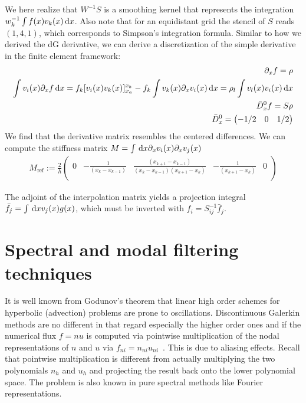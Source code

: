 We here realize that $W^{-1}S$  is a smoothing kernel that represents the
integration $w_k^{-1} \int f(x) v_k(x)\,\mathrm{d}x$.
Also note that for an equidistant grid the stencil of $S$ reads $(1,4,1)$, which
corresponds to Simpson's integration formula.
Similar to how we derived the dG derivative, we can derive a discretization of the
simple derivative in the finite element framework:
\begin{align}
    \partial_x f = \rho \nonumber\\
    \int v_i(x) \partial_x f \,\mathrm{d}x = f_k [v_i(x) v_k(x)]_{x_a}^{x_b} - f_k \int v_k(x)\partial_x v_i(x) \,\mathrm{d}x = \rho_l \int v_l(x) v_i(x)\,\mathrm{d}x \nonumber \\
    \bar D_x^0 f = S\rho \\
    \bar D_x^0 = \begin{pmatrix}
        -1/2 & 0 & 1/2
        \end{pmatrix}
\end{align}
We find that the derivative matrix resembles the centered differences.
We can compute the stiffness matrix $M=\int\,\mathrm{d}x \partial_x v_i(x)\partial_x v_j(x)$
\begin{align}
    M_{\text{ref}} := \frac{2}{h}\begin{pmatrix}
        0 & -\frac{1}{(x_{k} - x_{k-1})} & \frac{(x_{k+1}-x_{k-1})}{(x_{k} - x_{k-1})(x_{k+1} - x_k)} & -\frac{1}{(x_{k+1} - x_k)} & 0 \\
    \end{pmatrix}
\end{align}

The adjoint of the interpolation matrix yields a projection integral $\bar f_j = \int \,\mathrm{d}x v_j(x) g(x)$, which must be inverted with $f_i = S_{ij}^{-1} \bar f_j$.


\section{Spectral and modal filtering techniques}
It is well known from Godunov's theorem that linear high order schemes for hyperbolic (advection) problems
are prone to oscillations. Discontinuous Galerkin methods are no different in that regard
especially the higher order ones and if the numerical flux $f=nu$ is computed via pointwise multiplication
of the nodal representations of $n$ and $u$ via $f_{ni} = n_{ni} u_{ni}$~\cite{NodalDG}.
This is due to aliasing effects. Recall that pointwise multiplication is different from
actually multiplying the two polynomials $n_h$ and $u_h$ and projecting the result back onto the
lower polynomial space. The problem is also known in pure spectral methods like
Fourier representations.

